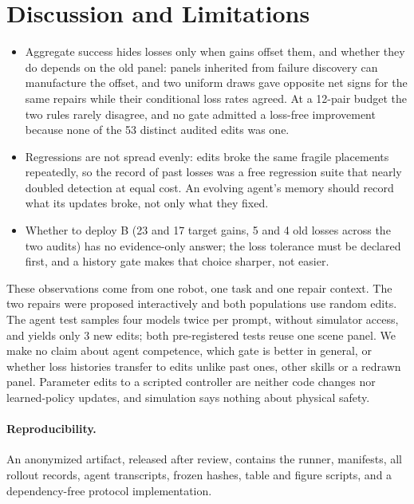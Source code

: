 \documentclass[letterpaper]{article} %
\begin{document}
\section{Discussion and Limitations}
\begin{itemize}
\item Aggregate success hides losses only when gains offset them, and whether they do depends on the old panel: panels inherited from failure discovery can manufacture the offset, and two uniform draws gave opposite net signs for the same repairs while their conditional loss rates agreed. At a 12-pair budget the two rules rarely disagree, and no gate admitted a loss-free improvement because none of the 53 distinct audited edits was one.
\item Regressions are not spread evenly: edits broke the same fragile placements repeatedly, so the record of past losses was a free regression suite that nearly doubled detection at equal cost. An evolving agent's memory should record what its updates broke, not only what they fixed.
\item Whether to deploy B (23 and 17 target gains, 5 and 4 old losses across the two audits) has no evidence-only answer; the loss tolerance must be declared first, and a history gate makes that choice sharper, not easier.
\end{itemize}

These observations come from one robot, one task and one repair context. The two repairs were proposed interactively and both populations use random edits. The agent test samples four models twice per prompt, without simulator access, and yields only 3 new edits; both pre-registered tests reuse one scene panel. We make no claim about agent competence, which gate is better in general, or whether loss histories transfer to edits unlike past ones, other skills or a redrawn panel. Parameter edits to a scripted controller are neither code changes nor learned-policy updates, and simulation says nothing about physical safety.

\paragraph{Reproducibility.} An anonymized artifact, released after review, contains the runner, manifests, all rollout records, agent transcripts, frozen hashes, table and figure scripts, and a dependency-free protocol implementation.


\end{document}
